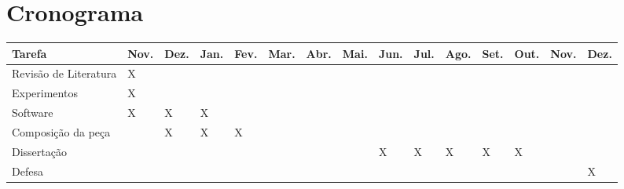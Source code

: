 \documentclass{article}
\begin{document}
\section{Cronograma}
\label{sec:cronograma}

\begin{table}[h]
  \centering
  \begin{tabular}{lllllllllllllll}
    \hline
    Tarefa & Nov. & Dez. & Jan. & Fev. & Mar. & Abr. & Mai. & Jun. & Jul. & Ago. & Set. &
    Out. & Nov. & Dez. \\
    \hline
    Revisão de Literatura & X &  &  & & & & & & & & & & & \\
    Experimentos & X &  &  & & & & & & & & & & & \\
    Software & X & X & X & & & & & & & & & & & \\
    Composição da peça & & X & X & X & & & & & & & & & & \\
    Dissertação & & & & & & & & X & X & X & X & X & & \\
    Defesa & & & & & & & & & & & & & & X \\
    \hline


    \hline
  \end{tabular}
  \label{tab:cronograma}
\end{table}


\renewcommand{\refname}{Bibliografia}

\nocite{adams1976mct,albrecht2004ect,alves05:_invar,alves2001cuc,batke2004edm,beard2003cmm,Blackburn2000thesis,buteau2005ama,buteau2003tmm,buteau1999mta,buteau2000csm,cambouropoulos2001mca,cambouropoulos2005pea,clifford1995cse,cook87:_techn_compar_analy,discipio2000ajc,dibben01:_motiv_struc_and_percep_of_simil,dowling1994mch,dowling1978sac,dowling1971rim,dowling1986mc,edworthy1985mca,forte83:_motiv_rhyth_contour_alto_rhaps,friedmann1987rmc,friedmann85:_method_discus_contour,ghias1995qhm,Hermann1995,hofmannengl1999vpa,ishiyama1996act,kim2000acb,kolinkski65:_struc_melod_movem,Li2004,lindsay1996ucm,logan2003tet,maidin:gam,marvin1988gtm,marvin87:_relat_music_contour,morris93:_new_direc_theor_analy_music_contour,morris1987cpc,AdamOckelford01012004,parsons1975dta,pauws2002cfo,polansky87mma,polansky92:_possib_impos_melod,prechelt2001imi,quinn2006mcp,quinn97:_fuzzy_exten_theor_contour,raju2002tam,raju2003tqh,ravenscroft2006rcc,music02:_melody,roy2004cbm,schmuckler1999tmm,schubert2006eih,schonberg1967fmc,seeger1960mml,serafine1989idm,sonoda2002bmr,Siu-LanTan04012004,toch1977sfm,toiviainen2002cmm,uitdenbogerd2003pre,weyde2005emr,yi1991tmc,zhu2002smc}



\end{document}
